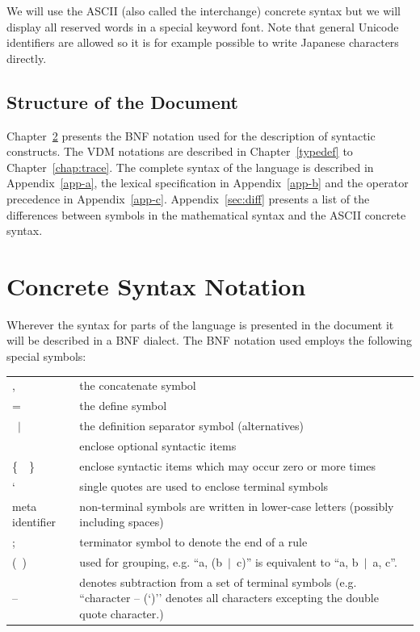 \documentclass{overturerepchap}
\newcommand{\Lit}[1]{`{\tt #1}\Quote}
\newcommand{\SeqPt}[1]{\{\ #1\ \}}
\newcommand{\dsepl}{\ $|$\ }
\newcommand{\OptPt}[1]{[\ #1\ ]}
\begin{document}
We will use the ASCII (also called the interchange)
concrete syntax but we will display all reserved words in a special
keyword font. Note that general Unicode identifiers are allowed so
it is for example possible to write Japanese characters directly.

\section{Structure of the Document}

Chapter~\ref{syntax-notation} presents the BNF notation used for the
description of syntactic constructs.  The VDM notations are described
in Chapter~\ref{typedef} to Chapter~\ref{chap:trace}.
The complete syntax of the language is described in
Appendix~\ref{app-a}, the lexical specification in
Appendix~\ref{app-b} and the operator precedence in
Appendix~\ref{app-c}. Appendix~\ref{sec:diff} presents a list of the
differences between symbols in the mathematical syntax and the ASCII
concrete syntax. 

\chapter{Concrete Syntax Notation}
\label{syntax-notation}


Wherever the syntax for parts of the language is presented in the
document it will be described in a BNF dialect. The BNF notation
used employs the following special symbols:

\newcommand{\singleQuote}{\texttt{\symbol{34}}}
\begin{tabular}{l@{\hspace{1cm}}p{10cm}}
  , &  the concatenate symbol \\
  = & the define symbol \\
  \dsepl & the definition separator symbol (alternatives)\\
  \OptPt{} & enclose optional syntactic items \\
  \SeqPt{} & enclose syntactic items which may occur zero or more times \\
  \Lit{ } & single quotes are used to enclose terminal symbols \\
    meta identifier & non-terminal symbols are written in lower-case letters
    (possibly including spaces) \\
  ;  & terminator symbol to denote the end of a rule \\
  (\ ) & used for grouping, e.g. ``a, (b\dsepl c)'' is equivalent to
    ``a, b\dsepl a, c''. \\
  -- & denotes subtraction from a set of terminal symbols 
    (e.g. ``character -- (\Lit{\singleQuote})'' denotes all characters
    excepting the double quote character.)
\end{tabular}
\end{document}
